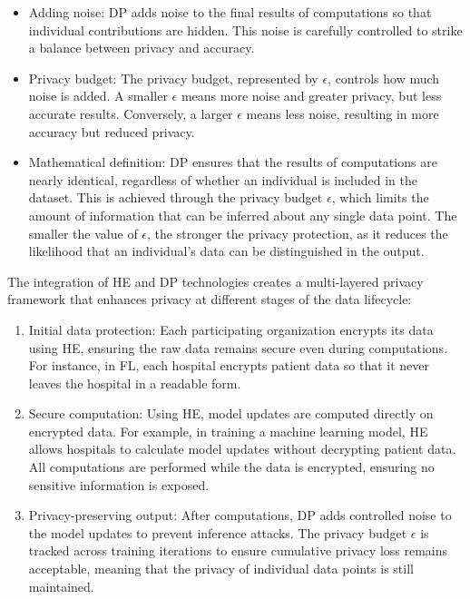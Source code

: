 \documentclass[
  letterpaper,
  DIV=11,
  numbers=noendperiod,
  oneside]{scrartcl}
\begin{document}
\begin{itemize}
\item
  Adding noise: DP adds noise to the final results of computations so
  that individual contributions are hidden. This noise is carefully
  controlled to strike a balance between privacy and accuracy.
\item
  Privacy budget: The privacy budget, represented by \(\epsilon\),
  controls how much noise is added. A smaller \(\epsilon\) means more
  noise and greater privacy, but less accurate results. Conversely, a
  larger \(\epsilon\) means less noise, resulting in more accuracy but
  reduced privacy.
\item
  Mathematical definition: DP ensures that the results of computations
  are nearly identical, regardless of whether an individual is included
  in the dataset. This is achieved through the privacy budget
  \(\epsilon\), which limits the amount of information that can be
  inferred about any single data point. The smaller the value of
  \(\epsilon\), the stronger the privacy protection, as it reduces the
  likelihood that an individual's data can be distinguished in the
  output.
\end{itemize}

The integration of HE and DP technologies creates a multi-layered
privacy framework that enhances privacy at different stages of the data
lifecycle:

\begin{enumerate}
\def\labelenumi{\arabic{enumi}.}
\item
  Initial data protection: Each participating organization encrypts its
  data using HE, ensuring the raw data remains secure even during
  computations. For instance, in FL, each hospital encrypts patient data
  so that it never leaves the hospital in a readable form.
\item
  Secure computation: Using HE, model updates are computed directly on
  encrypted data. For example, in training a machine learning model, HE
  allows hospitals to calculate model updates without decrypting patient
  data. All computations are performed while the data is encrypted,
  ensuring no sensitive information is exposed.
\item
  Privacy-preserving output: After computations, DP adds controlled
  noise to the model updates to prevent inference attacks. The privacy
  budget \(\epsilon\) is tracked across training iterations to ensure
  cumulative privacy loss remains acceptable, meaning that the privacy
  of individual data points is still maintained.
\end{enumerate}
\end{document}
